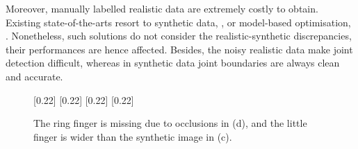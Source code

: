 Moreover, 
manually labelled realistic data are extremely costly to obtain. Existing state-of-the-arts resort to synthetic data, \eg \cite{Keskin2012}, or model-based optimisation, \eg \cite{LaGorce2011, Oikonomidis2012}. Nonetheless, such solutions do not consider the realistic-synthetic discrepancies, their performances are hence affected. Besides, the noisy realistic data make joint detection difficult, whereas in synthetic data joint boundaries are always clean and accurate.


\begin{figure}[ht]
\centering 
{}[0.22\linewidth]{  }
[0.22\linewidth]{  }
[0.22\linewidth]{  }
[0.22\linewidth]{  }
\caption{The ring finger is missing due to occlusions in (d), and the little finger is wider than the synthetic image in (c).}
\label{fig/hand/intro}
\end{figure}

